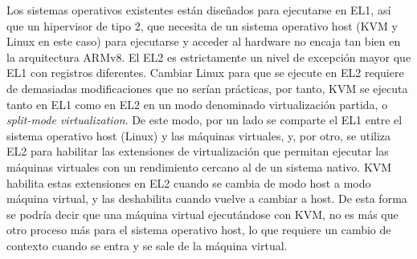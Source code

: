 Los sistemas operativos existentes están diseñados para ejecutarse en EL1, así que un hipervisor de tipo 2, que necesita de un sistema operativo host (KVM y Linux en este caso) para ejecutarse y acceder al hardware
no encaja tan bien en la arquitectura ARMv8. El EL2 es estrictamente un nivel de excepción mayor que EL1 con registros diferentes. Cambiar Linux para que se ejecute en EL2 requiere de demasiadas modificaciones que no serían prácticas, por tanto, KVM se ejecuta tanto en EL1 como en EL2 en un modo denominado virtualización partida, o \textit{split-mode virtualization}. De este modo, por un lado se comparte el EL1 entre el sistema operativo host (Linux) y las máquinas virtuales, y, por otro, se utiliza EL2 para habilitar las extensiones de virtualización que permitan ejecutar las máquinas virtuales con un rendimiento cercano al de un sistema nativo. KVM habilita estas extensiones en EL2 cuando se cambia de modo host a modo máquina virtual, y las deshabilita cuando vuelve a cambiar a host. De esta forma se podría decir que una máquina virtual ejecutándose con KVM, no es más que otro proceso más para el sistema operativo host, lo que requiere un cambio de contexto cuando se entra y se sale de la máquina virtual.\\


